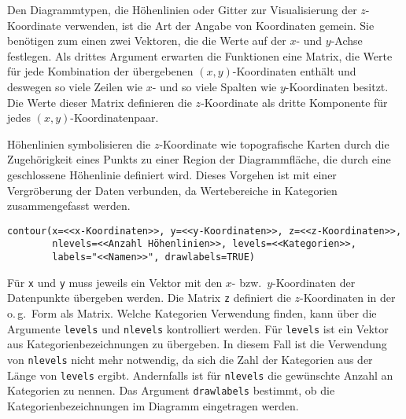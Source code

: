 Den Diagrammtypen, die Höhenlinien oder Gitter zur Visualisierung der $z$-Koordinate verwenden, ist die Art der Angabe von Koordinaten gemein. Sie benötigen zum einen zwei Vektoren, die die Werte auf der $x$- und $y$-Achse festlegen. Als drittes Argument erwarten die Funktionen eine Matrix, die Werte für jede Kombination der übergebenen $(x, y)$-Koordinaten enthält und deswegen so viele Zeilen wie $x$- und so viele Spalten wie $y$-Koordinaten besitzt. Die Werte dieser Matrix definieren die $z$-Koordinate als dritte Komponente für jedes $(x, y)$-Koordinatenpaar.

Höhenlinien symbolisieren die $z$-Koordinate wie topografische Karten durch die Zugehörigkeit eines Punkts zu einer Region der Diagrammfläche, die durch eine geschlossene Höhenlinie definiert wird. Dieses Vorgehen ist mit einer Vergröberung der Daten verbunden, da Wertebereiche in Kategorien zusammengefasst werden.
\begin{lstlisting}
contour(x=<<x-Koordinaten>>, y=<<y-Koordinaten>>, z=<<z-Koordinaten>>,
        nlevels=<<Anzahl Höhenlinien>>, levels=<<Kategorien>>,
        labels="<<Namen>>", drawlabels=TRUE)
\end{lstlisting}

Für \lstinline!x! und \lstinline!y! muss jeweils ein Vektor mit den $x$- bzw.\ $y$-Koordinaten der Datenpunkte übergeben werden. Die Matrix \lstinline!z! definiert die $z$-Koordinaten in der o.\,g.\ Form als Matrix. Welche Kategorien Verwendung finden, kann über die Argumente \lstinline!levels! und \lstinline!nlevels! kontrolliert werden. Für \lstinline!levels! ist ein Vektor aus Kategorienbezeichnungen zu übergeben. In diesem Fall ist die Verwendung von \lstinline!nlevels! nicht mehr notwendig, da sich die Zahl der Kategorien aus der Länge von \lstinline!levels! ergibt. Andernfalls ist für \lstinline!nlevels! die gewünschte Anzahl an Kategorien zu nennen. Das Argument \lstinline!drawlabels! bestimmt, ob die Kategorienbezeichnungen im Diagramm eingetragen werden.


